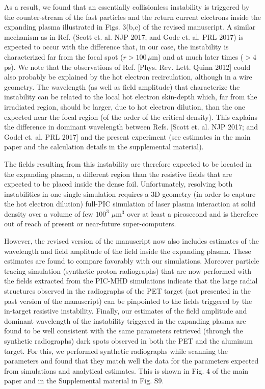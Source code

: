 \documentclass[aps,showpacs,superscriptaddress]{revtex4}%
\begin{document}
\begin{enumerate}
As a result, we found that an essentially collisionless instability  is triggered by the counter-stream of the fast particles and the return current electrons  inside the expanding plasma illustrated in Figs. 3(b,c) of the revised manuscript.
A similar mechanism as in Ref. (Scott et. al. NJP 2017; and Gode et. al. PRL 2017)   is expected to occur with the difference that, in our case,  the instability is characterized far from the focal spot ($r > 100 \, \mu$m) and at much later times ($>4$ ps).
We note that the observations of Ref. [Phys. Rev. Lett. Quinn 2012] could also probably be explained by the hot electron recirculation, although  in a wire geometry.
The wavelength (as well as field amplitude) that characterize the instability can be related to the local hot electron skin-depth which,  far from the irradiated region, should be larger, due to hot electron dilution, than the one expected near the focal region (of the order of the critical density). This explains the difference in dominant wavelength between Refs. [Scott et. al. NJP 2017; and Godel et. al. PRL 2017]  and the present experiment (see estimates in the main paper and the calculation details in the supplemental material).

The fields resulting from this instability  are therefore expected to be located in the expanding plasma, a different region than the resistive fields that are expected to be placed inside the dense foil.
Unfortunately, resolving both instabilities in one single simulation requires a  3D geometry (in order to capture the hot electron dilution) full-PIC simulation of laser plasma interaction at solid density over a volume of  few   $100^3$ $\mu$m$^3$   over at least a picosecond and is therefore out of reach of present or near-future super-computers.

However, the revised version of the manuscript now also includes estimates of the wavelength and field amplitude of the field inside the expanding plasma. These estimates are found to compare favorably with our simulations.  Moreover particle tracing simulation (synthetic proton radiographs) that are now performed with the fields extracted from the PIC-MHD simulations indicate that the large radial structures observed in the radiographs of the PET target (not presented in the past version of the manuscript) can be pinpointed to the fields triggered by the in-target resistive instability.
Finally, our estimates of the field amplitude and dominant wavelength of the instability triggered in the expanding plasma are found to be well consistent with the same parameters retrieved (through the synthetic radiographs) dark spots observed in both the PET and the aluminum target. For this, we performed synthetic radiographs while scanning the parameters and found that they match well the data for the parameters expected from simulations and analytical estimates. This is shown in Fig. 4  of the main paper  and in the Supplemental material in Fig. S9.


\end{enumerate}
\end{document}
